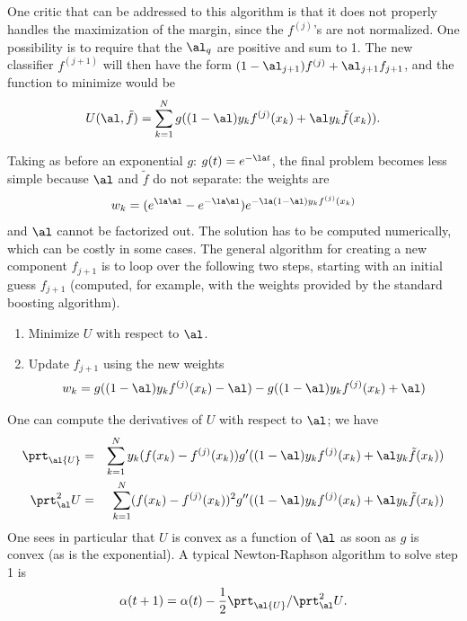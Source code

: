 \bigskip
One critic that can be addressed to this algorithm is that it does
not properly handles the maximization of the margin, since the
$f^{(j)}$'s  are not normalized. One possibility is to require that
the $\al_q$ are positive and sum to 1.
The new classifier $f^{(j+1)}$ will then have the form $(1-\al_{j+1})f^{(j)} + \al_{j+1}
f_{j+1}$, and the function to minimize would be
$$
U(\al, \tilde f) = \sum_{k=1}^N g((1-\al) y_kf^{(j)}(x_k) + \al y_k \tilde
f(x_k)).
$$

Taking as before an exponential $g$: $g(t) = e^{-\la t}$, the final
problem becomes less simple because $\al$ and $\tilde f$ do not
separate: the weights are    
$$w_k = (e^{\la \al} - e^{-\la \al})   e^{-\la(1-\al) y_k f^{(j)}(x_k)}$$
and $\al$ cannot be factorized out. The solution has to be computed
numerically, which can be costly in some cases. The general algorithm
for creating a new component $f_{j+1}$ is to loop over the following
two steps, starting with an initial guess $f_{j+1}$ (computed, for
example, with the weights provided by the standard boosting algorithm).
\begin{enumerate}[label=(\arabic*),wide]
\item Minimize $U$ with respect to $\al$.
\item Update $f_{j+1}$ using the new weights 
$$
w_k = g((1-\al) y_kf^{(j)}(x_k) - \al) - g((1-\al) y_kf^{(j)}(x_k) + \al)
$$
\end{enumerate}
One can compute the derivatives of $U$ with respect to $\al$; we have
\begin{eqnarray*}
\prt_\al{U} & = & \sum_{k=1}^N y_k (f(x_k)-f^{(j)}(x_k)) g'((1-\al) y_kf^{(j)}(x_k) + \al y_k \tilde
f(x_k))\\
{\prt^2_\al U} & = & \sum_{k=1}^N (f(x_k)-f^{(j)}(x_k))^2 g''((1-\al) y_kf^{(j)}(x_k) + \al y_k \tilde
f(x_k))
\end{eqnarray*}
One sees in particular that $U$ is convex as a function of $\al$ as
soon as $g$ is convex (as is the exponential). A typical Newton-Raphson algorithm to solve
step 1 is
$$
\alpha(t+1) = \alpha(t) - \frac{1}{2} \prt_\al {U}/
{\prt^2_\al U}.
$$


